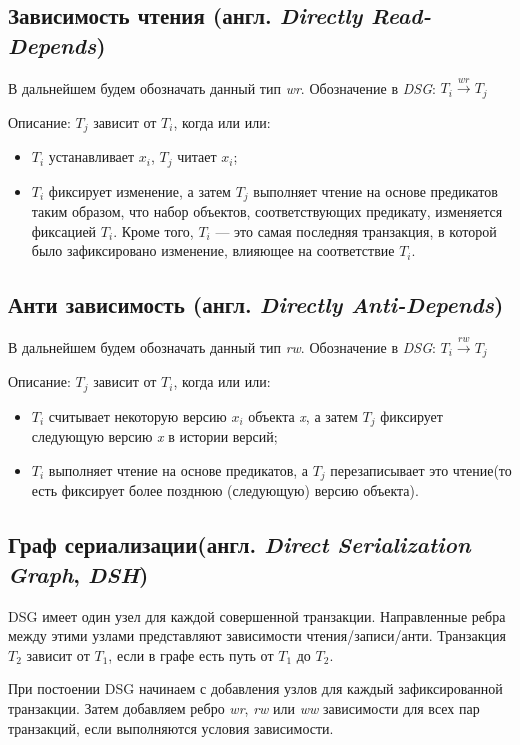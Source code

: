 \documentclass[12pt,  openany]{book}
\begin{document}
\subsection{Зависимость чтения (англ. \textit{Directly Read-Depends})}
В дальнейшем будем обозначать данный тип \textit{wr}. Обозначение в \textit{DSG}: $T_i  \xrightarrow{\textit{wr}} T_j$
\par
Описание: $T_j$ зависит от $T_i$,  когда или или:
\begin{itemize}
\item $T_i$ устанавливает $x_i$, $T_j$ читает $x_i$;
\item $T_i$ фиксирует изменение, а затем $T_j$ выполняет чтение на основе предикатов таким образом, что набор объектов, соответствующих предикату, изменяется фиксацией $T_i$.   Кроме того, $T_i$ --- это самая последняя транзакция, в которой было зафиксировано изменение, влияющее на соответствие $T_i$.
\end{itemize}

\subsection{Анти зависимость (англ. \textit{Directly Anti-Depends})}
В дальнейшем будем обозначать данный тип \textit{rw}. Обозначение в \textit{DSG}: $T_i  \xrightarrow{\textit{rw}} T_j$
\par
Описание: $T_j$ зависит от $T_i$,  когда или или:
\begin{itemize}
\item $T_i$ считывает некоторую версию $x_i$ объекта \textit{x}, а затем $T_j$  фиксирует следующую версию \textit{x} в истории версий;
\item $T_i$ выполняет чтение на основе предикатов, а $T_j$ перезаписывает это чтение(то есть фиксирует более позднюю (следующую) версию  объекта).
\end{itemize}

\subsection{Граф сериализации(англ. \textit{Direct Serialization Graph}, \textit{DSH})}
DSG имеет один узел для каждой совершенной транзакции. Направленные ребра между этими узлами представляют зависимости чтения/записи/анти. Транзакция $T_2$ зависит от $T_1$, если в графе есть путь от $T_1$ до $T_2$. 
\par
При постоении DSG начинаем  с добавления узлов для каждый зафиксированной транзакции. Затем добавляем ребро \textit{wr}, \textit{rw} или \textit{ww} зависимости для всех пар транзакций, если выполняются условия зависимости.
\end{document}
